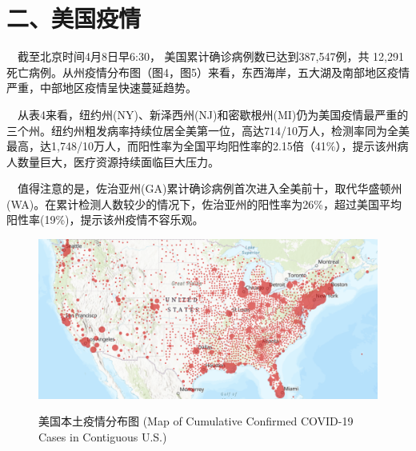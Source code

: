 \documentclass[]{article}
\begin{document}
\newpage

\hypertarget{section-3}{%
\section{\texorpdfstring{\textcolor{glaucous}{二、美国疫情}}{}}\label{section-3}}

\(\quad\)截至北京时间4月8日早6:30，
美国累计确诊病例数已达到387,547例，共 12,291
死亡病例。从州疫情分布图（图4，图5）来看，东西海岸，五大湖及南部地区疫情严重，中部地区疫情呈快速蔓延趋势。

\(\quad\)从表4来看，纽约州(NY)、新泽西州(NJ)和密歇根州(MI)仍为美国疫情最严重的三个州。纽约州粗发病率持续位居全美第一位，高达714/10万人，检测率同为全美最高，达1,748/10万人，而阳性率为全国平均阳性率的2.15倍（41\%），提示该州病人数量巨大，医疗资源持续面临巨大压力。

\(\quad\)值得注意的是，佐治亚州(GA)累计确诊病例首次进入全美前十，取代华盛顿州(WA)。在累计检测人数较少的情况下，佐治亚州的阳性率为26\%，超过美国平均阳性率(19\%)，提示该州疫情不容乐观。

\begin{figure}[H] 
\caption{美国本土疫情分布图 (Map of Cumulative Confirmed COVID-19 Cases in Contiguous U.S.)} %
\centering
\includegraphics[]{./input/covid4.png} %
\label{} %
\end{figure}
\end{document}
